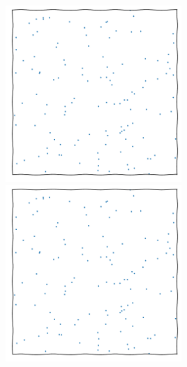 \documentclass[aspectratio=169]{beamer}
\begin{document}
\begin{frame}
\begin{columns}
        \includegraphics[width=0.5\textwidth,page=21]{figures/himmelblau}%
        \includegraphics[width=0.5\textwidth,page=15]{figures/himmelblau}
    \end{columns}
\end{frame}
\end{document}
